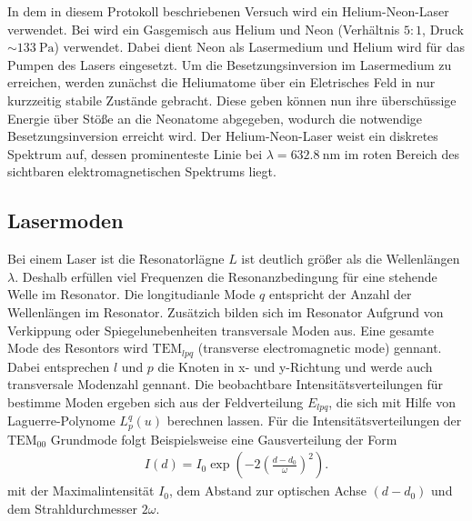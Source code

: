 In dem in diesem Protokoll beschriebenen
Versuch wird ein Helium-Neon-Laser verwendet.
Bei wird ein Gasgemisch aus Helium und
Neon (Verhältnis $5:1$, Druck $\sim \SI{133}{\pascal}$) verwendet.
Dabei dient Neon als Lasermedium und Helium wird für das Pumpen
des Lasers eingesetzt. Um die Besetzungsinversion im Lasermedium
zu erreichen, werden zunächst die Heliumatome über ein
Eletrisches Feld in nur kurzzeitig stabile Zustände gebracht.
Diese geben können nun ihre
überschüssige Energie über Stöße an die Neonatome abgegeben,
wodurch die notwendige Besetzungsinversion erreicht wird.
Der Helium-Neon-Laser weist ein diskretes Spektrum auf, dessen
prominenteste Linie bei $\lambda = \SI{632.8}{\nano\meter}$ im
roten Bereich des sichtbaren elektromagnetischen Spektrums liegt.






\subsection{Lasermoden}
\label{subsec:lasermoden}
Bei einem Laser ist die
Resonatorlägne $L$ ist deutlich größer
als die Wellenlängen $\lambda$. Deshalb erfüllen viel Frequenzen
die Resonanzbedingung für eine stehende Welle im Resonator.
Die longitudianle Mode $q$ entspricht der Anzahl der Wellenlängen
im Resonator. Zusätzich bilden sich im Resonator
Aufgrund von Verkippung oder Spiegelunebenheiten
transversale Moden aus.
Eine gesamte Mode des Resontors wird
$\text{TEM}_{lpq}$ (transverse electromagnetic mode)
gennant. Dabei entsprechen $l$ und $p$ die Knoten in
x- und y-Richtung und werde auch
transversale Modenzahl gennant.
Die beobachtbare Intensitätsverteilungen für bestimme Moden
ergeben sich aus der Feldverteilung $E_{lpq}$, die
sich mit Hilfe von Laguerre-Polynome $L_p^q(u)$
berechnen lassen. Für
die Intensitätsverteilungen der $\text{TEM}_{00}$ Grundmode folgt Beispielsweise
eine Gausverteilung der Form
\begin{align}
I(d)=I_0\exp\left(-2\left(\frac{d-d_0}{\omega}\right)^2\right). \label{eqn:TEM00}
\end{align}
mit der Maximalintensität $I_0$, dem Abstand zur optischen Achse $(d-d_0)$
und dem Strahldurchmesser $2\omega$.
